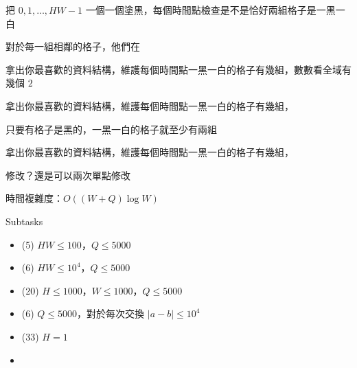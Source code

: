 \begin{frame}{}
    \todo
\end{frame}

\begin{frame}{}
    把 $0, 1, \dots, HW - 1$ 一個一個塗黑，每個時間點檢查是不是恰好兩組格子是一黑一白
\end{frame}

\begin{frame}{}
    對於每一組相鄰的格子，他們在

     {
        拿出你最喜歡的資料結構，維護每個時間點一黑一白的格子有幾組，數數看全域有幾個 $2$
    }

     {
        拿出你最喜歡的資料結構，維護每個時間點一黑一白的格子有幾組，
    }

     {
        只要有格子是黑的，一黑一白的格子就至少有兩組

        拿出你最喜歡的資料結構，維護每個時間點一黑一白的格子有幾組，
    }
\end{frame}

\begin{frame}{}
    修改？還是可以兩次單點修改

    時間複雜度：$O((W + Q) \log W)$
\end{frame}

\begin{frame}{}
    \begin{problem}
        Subtasks

        \begin{itemize}
            \item (5) $HW \le 100$，$Q \le 5000$
            \item (6) $HW \le 10^4$，$Q \le 5000$
            \item (20) $H \le 1000$，$W \le 1000$，$Q \le 5000$
            \item (6) $Q \le 5000$，對於每次交換 $|a - b| \le 10^4$
            \item (33) $H = 1$
            \item {}
        \end{itemize}
    \end{problem}

\end{frame}


